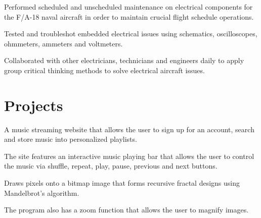 \documentclass[letterpaper]{deedy-resume} %
\begin{document}
\begin{minipage}[t]{0.66\textwidth}
\vspace{\topsep} %
\begin{tightitemize}
\item Performed scheduled and unscheduled maintenance on electrical components for the F/A-18 naval aircraft in order to maintain crucial flight schedule operations.
\item Tested and troubleshot embedded electrical issues using schematics, oscilloscopes, ohmmeters, ammeters and voltmeters.
\item Collaborated with other electricians, technicians and engineers daily to apply group critical thinking methods to solve electrical aircraft issues.
\end{tightitemize}

\sectionspace %


\section{Projects}


\vspace{\topsep} %
\begin{tightitemize}
\item A music streaming website that allows the user to sign up for an account, search and store music into personalized playlists.
\item The site features an interactive music playing bar that allows the user to control the music via shuffle, repeat, play, pause, previous and next buttons.
\end{tightitemize}

\sectionspace %



\vspace{\topsep} %
\begin{tightitemize}
\item Draws pixels onto a bitmap image that forms recursive fractal designs using Mandelbrot’s algorithm.
\item The program also has a zoom function that allows the user to magnify images.
\end{tightitemize}


\end{minipage}
\end{document}
